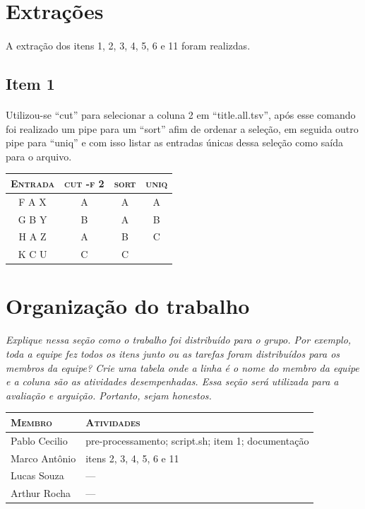 \documentclass[12pt]{article}
\begin{document}
\section{Extrações}

\paragraph{}
A extração dos itens 1, 2, 3, 4, 5, 6 e 11 foram realizdas.

\subsection*{Item 1}

\paragraph{}
Utilizou-se ``cut'' para selecionar a coluna 2 em ``title.all.tsv'', após esse comando foi realizado um pipe para um ``sort'' afim de ordenar a seleção, em seguida outro pipe para ``uniq'' e com isso listar as entradas únicas dessa seleção como saída para o arquivo.

\begin{table}[!htb]
    \begin{tabular}{ c c c c }
        \textsc{Entrada} & \textsc{cut -f 2} & \textsc{sort} & \textsc{uniq} \\ 
        \hline
        F A X & A & A & A \\ 
        G B Y & B & A & B \\
        H A Z & A & B & C \\
        K C U & C & C &   \\
    \end{tabular}
\end{table}

\section{Organização do trabalho}

\emph{Explique nessa seção como o trabalho foi distribuído para o grupo.
Por exemplo, toda a equipe fez todos os itens junto ou as tarefas foram 
distribuídos para os membros da equipe? Crie uma tabela onde a linha é o
nome do membro da equipe e a coluna são as atividades desempenhadas.
Essa seção será utilizada para a avaliação e arguição. Portanto, sejam
honestos.}

\begin{table}[!htb]
    \begin{tabular}{p{5cm}p{7.5cm}}
    
        \textsc{Membro}      & \textsc{Atividades} \\ 
	    \hline
        Pablo Cecilio & pre-processamento; script.sh; item 1; documentação \\ 
        Marco Antônio & itens 2, 3, 4, 5, 6 e 11\\
        Lucas Souza & --- \\
        Arthur Rocha & --- \\

    \end{tabular}
\end{table}
\end{document}
